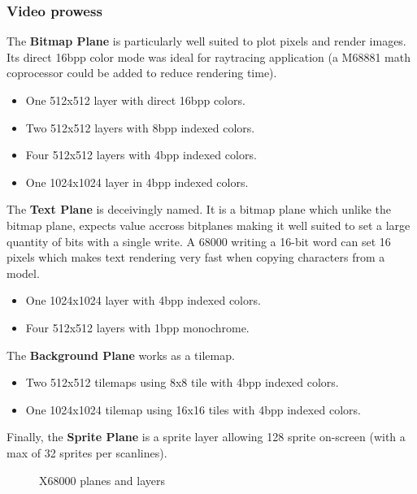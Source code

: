 \subsubsection{Video prowess}

The \textbf{Bitmap Plane} is particularly well suited to plot pixels and render images. Its direct 16bpp color mode was ideal for raytracing application (a M68881 math coprocessor could be added to reduce rendering time). 


\begin{itemize}[topsep=0pt]
\item One 512x512 layer with direct 16bpp colors.
\item Two 512x512 layers with 8bpp indexed colors.
\item Four 512x512 layers with 4bpp indexed colors.
\item One 1024x1024 layer in 4bpp indexed colors.
\end{itemize}

The \textbf{Text Plane} is deceivingly named. It is a bitmap plane which unlike the bitmap plane, expects value accross bitplanes making it well suited to set a large quantity of bits with a single write. A 68000 writing a 16-bit word can set 16 pixels which makes text rendering very fast when copying characters from a model. 

\begin{itemize}[topsep=0pt]
\item One 1024x1024 layer with 4bpp indexed colors.
\item Four 512x512 layers with 1bpp monochrome.
\end{itemize}


The \textbf{Background Plane} works as a tilemap. 
\begin{itemize}[topsep=0pt]
\item Two 512x512 tilemaps using 8x8 tile with 4bpp indexed colors.
\item One 1024x1024 tilemap using 16x16 tiles with 4bpp indexed colors.
\end{itemize}

Finally, the \textbf{Sprite Plane} is a sprite layer allowing 128 sprite on-screen (with a max of 32 sprites per scanlines).


 \begin{figure}[H]
\caption*{X68000 planes and layers}
\end{figure}



